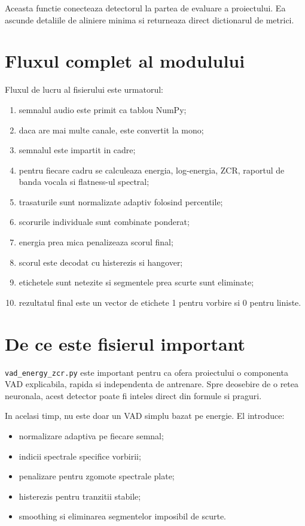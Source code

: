 \documentclass[12pt,a4paper]{report}
\begin{document}
Aceasta functie conecteaza detectorul la partea de evaluare a proiectului. Ea ascunde detaliile de aliniere minima si returneaza direct dictionarul de metrici.

\chapter{Fluxul complet al modulului}

Fluxul de lucru al fisierului este urmatorul:

\begin{enumerate}
    \item semnalul audio este primit ca tablou NumPy;
    \item daca are mai multe canale, este convertit la mono;
    \item semnalul este impartit in cadre;
    \item pentru fiecare cadru se calculeaza energia, log-energia, ZCR, raportul de banda vocala si flatness-ul spectral;
    \item trasaturile sunt normalizate adaptiv folosind percentile;
    \item scorurile individuale sunt combinate ponderat;
    \item energia prea mica penalizeaza scorul final;
    \item scorul este decodat cu histerezis si hangover;
    \item etichetele sunt netezite si segmentele prea scurte sunt eliminate;
    \item rezultatul final este un vector de etichete 1 pentru vorbire si 0 pentru liniste.
\end{enumerate}

\chapter{De ce este fisierul important}

\texttt{vad\_energy\_zcr.py} este important pentru ca ofera proiectului o componenta VAD explicabila, rapida si independenta de antrenare. Spre deosebire de o retea neuronala, acest detector poate fi inteles direct din formule si praguri.

In acelasi timp, nu este doar un VAD simplu bazat pe energie. El introduce:

\begin{itemize}
    \item normalizare adaptiva pe fiecare semnal;
    \item indicii spectrale specifice vorbirii;
    \item penalizare pentru zgomote spectrale plate;
    \item histerezis pentru tranzitii stabile;
    \item smoothing si eliminarea segmentelor imposibil de scurte.
\end{itemize}
\end{document}
